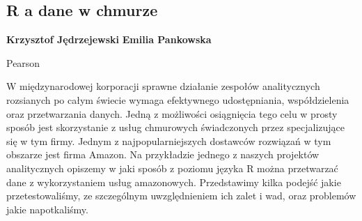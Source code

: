 \documentclass[\main/boa.tex]{subfiles}
\begin{document}
\subsection{R a dane w chmurze}

\begin{minipage}{0.915\textwidth}
	\centering
  {\bf {} Krzysztof Jędrzejewski}
    {\bf {} Emilia Pankowska}
\end{minipage}



\begin{affiliations}
\begin{minipage}{0.915\textwidth}
\centering
Pearson \\[-2pt]
\end{minipage}
\end{affiliations}

\vskip 0.3cm

W międzynarodowej korporacji sprawne działanie zespołów analitycznych rozsianych po całym świecie wymaga efektywnego udostępniania, współdzielenia oraz przetwarzania danych. Jedną z możliwości osiągnięcia tego celu w prosty sposób jest skorzystanie z usług chmurowych świadczonych przez specjalizujące się w tym firmy. Jednym z najpopularniejszych dostawców rozwiązań w tym obszarze jest firma Amazon. Na przykładzie jednego z naszych projektów analitycznych opiszemy w jaki sposób z poziomu języka R można przetwarzać dane z wykorzystaniem usług amazonowych. Przedstawimy kilka podejść jakie przetestowaliśmy, ze szczególnym uwzględnieniem ich zalet i wad, oraz problemów jakie napotkaliśmy. 
\end{document}
